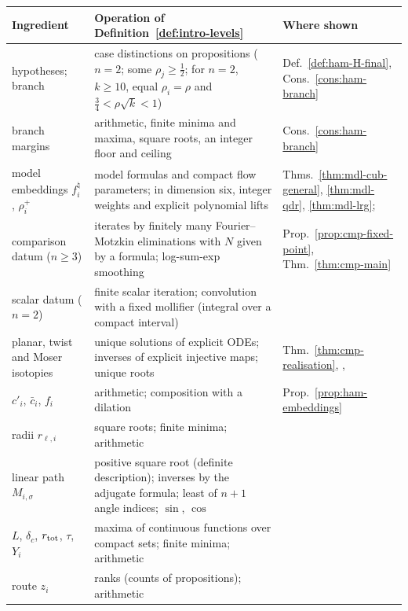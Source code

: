 \begin{table}[ht]
\centering\footnotesize
\renewcommand{\arraystretch}{1.15}
\begin{tabular}{@{}L{0.27\textwidth}L{0.4\textwidth}L{0.27\textwidth}@{}}
\toprule
Ingredient & Operation of Definition~\ref{def:intro-levels} & Where shown\\
\midrule
hypotheses; branch & case distinctions on propositions ($n=2$; some $\rho_j\ge\frac12$; for $n=2$, $k\ge10$, equal $\rho_i=\rho$ and $\frac34<\rho\sqrt k<1$) & Def.~\ref{def:ham-H-final}, Cons.~\ref{cons:ham-branch}\\
branch margins & arithmetic, finite minima and maxima, square roots, an integer floor and ceiling & Cons.~\ref{cons:ham-branch}\\
model embeddings $f^\natural_i$, $\rho_i^+$ & model formulas and compact flow parameters; in dimension six, integer weights and explicit polynomial lifts & Thms.~\ref{thm:mdl-cub-general}, \ref{thm:mdl-qdr}, \ref{thm:mdl-lrg}; \\
comparison datum ($n\ge3$) & iterates by finitely many Fourier--Motzkin eliminations with $N$ given by a formula; log-sum-exp smoothing & Prop.~\ref{prop:cmp-fixed-point}, Thm.~\ref{thm:cmp-main}\\
scalar datum ($n=2$) & finite scalar iteration; convolution with a fixed mollifier (integral over a compact interval) & \\
planar, twist and Moser isotopies & unique solutions of explicit ODEs; inverses of explicit injective maps; unique roots & Thm.~\ref{thm:cmp-realisation}, , \\
$c'_i$, $\bar c_i$, $f_i$ & arithmetic; composition with a dilation & Prop.~\ref{prop:ham-embeddings}\\
radii $r_{\ell,i}$ & square roots; finite minima; arithmetic & \\
linear path $M_{i,\sigma}$ & positive square root (definite description); inverses by the adjugate formula; least of $n+1$ angle indices; $\sin$, $\cos$ & \\
$L$, $\delta_c$, $r_{\rm tot}$, $\tau$, $Y_i$ & maxima of continuous functions over compact sets; finite minima; arithmetic & \\
route $z_i$ & ranks (counts of propositions); arithmetic & \\

\end{tabular}
\end{table}
